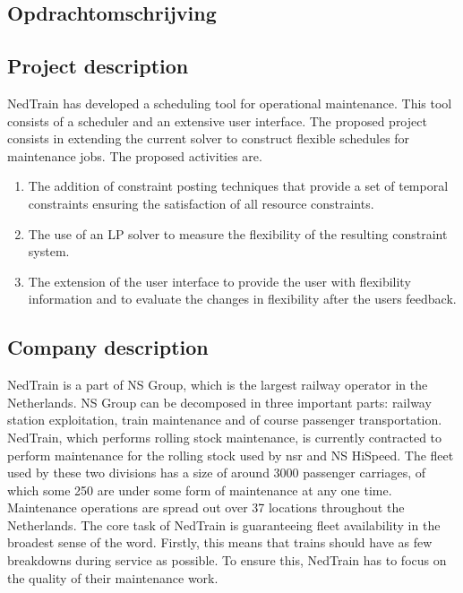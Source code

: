 \begin{appendices}

\section{Opdrachtomschrijving} \label{app:A}
\subsection*{Project description}
NedTrain has developed a scheduling tool for operational maintenance. This tool consists of a scheduler and an extensive user interface. The proposed project consists in extending the current solver to construct flexible schedules for maintenance jobs. The proposed activities are.

\begin{enumerate}
	\item The addition of constraint posting techniques that provide a set of temporal constraints ensuring the satisfaction of all resource constraints.
	\item The use of an LP solver to measure the flexibility of the resulting constraint system.
	\item The extension of the user interface to provide the user with flexibility information and to evaluate the changes in flexibility after the users feedback.
\end{enumerate}

\subsection*{Company description}

NedTrain is a part of NS Group, which is the largest railway operator in the Netherlands. NS Group can be decomposed in three important parts: railway station exploitation, train maintenance and of course passenger transportation. NedTrain, which performs rolling stock maintenance, is currently contracted to perform maintenance for the rolling stock used by nsr and NS HiSpeed. The fleet used by these two divisions has a size of around 3000 passenger carriages, of which some 250 are under some form of maintenance at any one time. Maintenance operations are spread out over 37 locations throughout the Netherlands. The core task of NedTrain is guaranteeing fleet availability in the broadest sense of the word. Firstly, this means that trains should have as few breakdowns during service as possible. To ensure this, NedTrain has to focus on the quality of their maintenance work.


\end{appendices}
